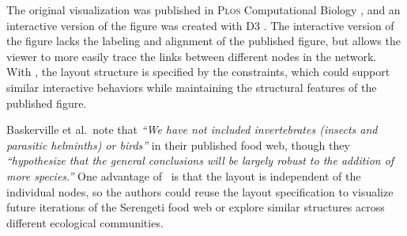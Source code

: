 The original visualization was published in \textsc{Plos} Computational
Biology \cite{baskerville2011spatial}, and an interactive version of the
figure was created with D3 \cite{baskerville2011interactive}. The
interactive version of the figure lacks the labeling and alignment of the
published figure, but allows the viewer to more easily trace the links
between different nodes in the network. With \projectname, the layout
structure is specified by the constraints, which could support similar
interactive behaviors while maintaining the structural features of the
published figure.

Baskerville et al.\ note that \emph{``We have not included invertebrates
  (insects and parasitic helminths) or birds''} in their published food
web, though they \emph{``hypothesize that the general conclusions will be
  largely robust to the addition of more species.''} One advantage of
\projectname~is that the layout is independent of the individual nodes, so
the authors could reuse the layout specification to visualize future iterations
of the Serengeti food web or explore similar structures across different
ecological communities.
